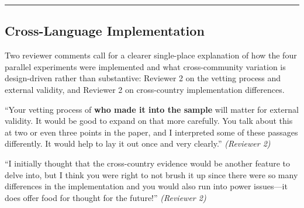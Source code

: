 \documentclass[12pt]{article}
\newenvironment{reviewquote}{%
  \def\FrameCommand{{\color{quotebarcolor}\vrule width 2pt}\colorbox{quotebg}}%
  \MakeFramed{\advance\hsize-\width \FrameRestore}%
  \small
}{%
  \endMakeFramed
}
\newcommand{\sectionnote}[1]{\par\smallskip#1\par\medskip}
\begin{document}
\bigskip\hrule\bigskip

\subsection{Cross-Language Implementation}

\sectionnote{Two reviewer comments call for a clearer single-place explanation of how the four parallel experiments were implemented and what cross-community variation is design-driven rather than substantive: Reviewer 2 on the vetting process and external validity, and Reviewer 2 on cross-country implementation differences.}

\begin{reviewquote}
``Your vetting process of \textbf{who made it into the sample} will matter for external validity. It would be good to expand on that more carefully. You talk about this at two or even three points in the paper, and I interpreted some of these passages differently. It would help to lay it out once and very clearly.'' \textit{(Reviewer 2)}
\end{reviewquote}

\begin{reviewquote}
``I initially thought that the cross-country evidence would be another feature to delve into, but I think you were right to not brush it up since there were so many differences in the implementation and you would also run into power issues---it does offer food for thought for the future!'' \textit{(Reviewer 2)}
\end{reviewquote}
\end{document}
